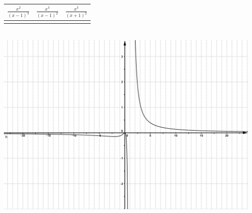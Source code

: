 \documentclass[a4paper,11pt,spanish,sans]{exam}
\newcommand{\Ts}{\rule{0pt}{2.8ex}}       %
\newcommand{\Bs}{\rule[-1.5ex]{0pt}{0pt}} %
\begin{document}
\begin{minipage}{0.5\textwidth}
	\centering
	\label{mc1}
	\begin{tabular}{|c|c|c|}
		\hline
		$\frac{x^2}{(x-1)^3}$  & $\frac{x^3}{(x-1)^2}$ & $\frac{x^3}{(x+1)^2}$ \Ts \Bs   \\ \hline
		&   &      \\ \hline
	\end{tabular}\\
	\centering
	\includegraphics[width= 0.95\linewidth]{integradora3.png}
\end{minipage}
\end{document}
